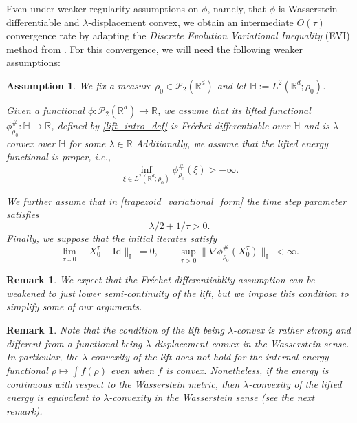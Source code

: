 \documentclass[11pt,a4paper]{amsart}
\newcommand{\1}{\mathds{1}}
\newtheorem{remark}[theorem]{\textbf{Remark}}
\newtheorem{assumption}{\textbf{Assumption}}
\numberwithin{equation}{section}
\begin{document}
Even under weaker regularity assumptions on $\phi$, namely, that $\phi$ is Wasserstein differentiable and $\lambda$-displacement convex, we obtain an intermediate $O(\tau)$ convergence rate by adapting the \textit{Discrete Evolution Variational Inequality} (EVI) method from \cite{ambrosio2005gradient}. For this convergence, we will need the following weaker assumptions:


\begin{assumption} \label{assume_rough}
    We fix a measure $\rho_0 \in \mathcal{P}_2(\mathbb{R}^d)$ and let $\mathbb{H} := L^2(\mathbb{R}^d;\rho_0)$.  \smallskip 

\noindent Given a functional $\phi : \mathcal{P}_2(\mathbb{R}^d) \to \mathbb{R}$, we assume that its lifted functional $\phi_{\rho_0}^{\#} : \mathbb{H} \to \mathbb{R}$, defined by \eqref{lift_intro_def}
is Fréchet differentiable over $\mathbb{H}$ and is $\lambda$-convex over $\mathbb{H}$ for some $\lambda \in \mathbb{R}$ Additionally, we assume that the lifted energy functional is proper, i.e.,
\[
\inf_{\xi \in L^2(\mathbb{R}^d;\rho_0)} \phi^{\#}_{\rho_0}(\xi) > -\infty.
\] 

\noindent We further assume that in \eqref{trapezoid_variational_form} the time step parameter satisfies
\[
    \lambda/2 + 1/\tau > 0.
\]
Finally, we suppose that the initial iterates satisfy
\[
    \lim_{\tau \downarrow 0} \|X_0^{\tau} - \mathrm{Id}\|_{\mathbb{H}} = 0,
    \qquad
    \sup_{\tau > 0} \|\nabla \phi^{\#}_{\rho_0}(X_0^{\tau})\|_{\mathbb{H}} < \infty.
\]
\end{assumption}

\begin{remark}
    We expect that the Fréchet differentiablity assumption can be weakened to just lower semi-continuity of the lift, but we impose this condition to simplify some of our arguments.
\end{remark} 


\begin{remark}
    Note that the condition of the lift being $\lambda$-convex is rather strong and different from a functional being $\lambda$-displacement convex in the Wasserstein sense.  In particular, the $\lambda$-convexity of the lift does not hold for the internal energy functional $\rho\mapsto \int f(\rho)$ even when $f$ is convex.  Nonetheless, if the energy is continuous with respect to the Wasserstein metric, then $\lambda$-convexity of the lifted energy is equivalent to $\lambda$-convexity in the Wasserstein sense (see the next remark).
\end{remark}
 
\end{document}
